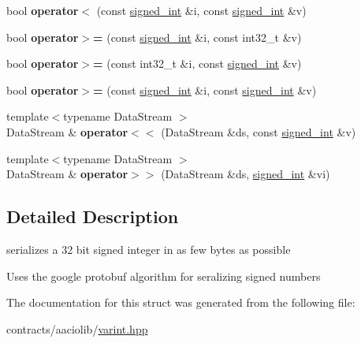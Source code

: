 \begin{DoxyCompactItemize}
\item 
\mbox{\label{structsigned__int_ac2eea5a817b5774997100c0cdb8c81d2}} 
bool {\bfseries operator$<$} (const \mbox{\hyperlink{structsigned__int}{signed\+\_\+int}} \&i, const \mbox{\hyperlink{structsigned__int}{signed\+\_\+int}} \&v)
\item 
\mbox{\label{structsigned__int_a0b7eb30fe9fdbc1f375309719ad8248c}} 
bool {\bfseries operator$>$=} (const \mbox{\hyperlink{structsigned__int}{signed\+\_\+int}} \&i, const int32\+\_\+t \&v)
\item 
\mbox{\label{structsigned__int_accb4bcf54dbdec11cdcbd06167d677c9}} 
bool {\bfseries operator$>$=} (const int32\+\_\+t \&i, const \mbox{\hyperlink{structsigned__int}{signed\+\_\+int}} \&v)
\item 
\mbox{\label{structsigned__int_ab249950f493a3623cf845633e07df502}} 
bool {\bfseries operator$>$=} (const \mbox{\hyperlink{structsigned__int}{signed\+\_\+int}} \&i, const \mbox{\hyperlink{structsigned__int}{signed\+\_\+int}} \&v)
\item 
\mbox{\label{structsigned__int_afabc024d2020505d135d9efbcf9e16a8}} 
{\footnotesize template$<$typename Data\+Stream $>$ }\\Data\+Stream \& {\bfseries operator$<$$<$} (Data\+Stream \&ds, const \mbox{\hyperlink{structsigned__int}{signed\+\_\+int}} \&v)
\item 
\mbox{\label{structsigned__int_a7eef08b0d7662636e1b0fa0f90bc8ccd}} 
{\footnotesize template$<$typename Data\+Stream $>$ }\\Data\+Stream \& {\bfseries operator$>$$>$} (Data\+Stream \&ds, \mbox{\hyperlink{structsigned__int}{signed\+\_\+int}} \&vi)
\end{DoxyCompactItemize}


\subsection{Detailed Description}
serializes a 32 bit signed integer in as few bytes as possible 

Uses the google protobuf algorithm for seralizing signed numbers 

The documentation for this struct was generated from the following file\+:\begin{DoxyCompactItemize}
\item 
contracts/aaciolib/\mbox{\hyperlink{contracts_2aaciolib_2varint_8hpp}{varint.\+hpp}}\end{DoxyCompactItemize}
